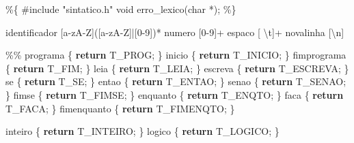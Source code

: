 \documentclass[
  brazilian,
  letterpaper,
]{book}
\newenvironment{Shaded}{\begin{snugshade}}{\end{snugshade}}
\newcommand{\ControlFlowTok}[1]{\textcolor[rgb]{0.00,0.23,0.31}{\textbf{#1}}}
\newcommand{\DataTypeTok}[1]{\textcolor[rgb]{0.68,0.00,0.00}{#1}}
\newcommand{\DecValTok}[1]{\textcolor[rgb]{0.68,0.00,0.00}{#1}}
\newcommand{\ImportTok}[1]{\textcolor[rgb]{0.00,0.46,0.62}{#1}}
\newcommand{\NormalTok}[1]{\textcolor[rgb]{0.00,0.23,0.31}{#1}}
\newcommand{\OperatorTok}[1]{\textcolor[rgb]{0.37,0.37,0.37}{#1}}
\newcommand{\PreprocessorTok}[1]{\textcolor[rgb]{0.68,0.00,0.00}{#1}}
\theoremstyle{plain}
\theoremstyle{definition}
\theoremstyle{remark}
\begin{document}
\begin{Shaded}
\begin{Highlighting}[]
\OperatorTok{\%\{}
\PreprocessorTok{\#include }\ImportTok{"sintatico.h"}
\DataTypeTok{void}\NormalTok{ erro\_lexico}\OperatorTok{(}\DataTypeTok{char} \OperatorTok{*);}
\OperatorTok{\%\}}

\NormalTok{identificador }\OperatorTok{[}\NormalTok{a}\OperatorTok{{-}}\NormalTok{zA}\OperatorTok{{-}}\NormalTok{Z}\OperatorTok{]([}\NormalTok{a}\OperatorTok{{-}}\NormalTok{zA}\OperatorTok{{-}}\NormalTok{Z}\OperatorTok{]|[}\DecValTok{0}\OperatorTok{{-}}\DecValTok{9}\OperatorTok{])*}
\NormalTok{numero }\OperatorTok{[}\DecValTok{0}\OperatorTok{{-}}\DecValTok{9}\OperatorTok{]+}
\NormalTok{espaco }\OperatorTok{[}\NormalTok{ \textbackslash{}t}\OperatorTok{]+}
\NormalTok{novalinha }\OperatorTok{[}\NormalTok{\textbackslash{}n}\OperatorTok{]}

\OperatorTok{\%\%}
\NormalTok{programa          }\OperatorTok{\{} \ControlFlowTok{return}\NormalTok{ T\_PROG}\OperatorTok{;} \OperatorTok{\}}
\NormalTok{inicio            }\OperatorTok{\{} \ControlFlowTok{return}\NormalTok{ T\_INICIO}\OperatorTok{;} \OperatorTok{\}}
\NormalTok{fimprograma       }\OperatorTok{\{} \ControlFlowTok{return}\NormalTok{ T\_FIM}\OperatorTok{;} \OperatorTok{\}}
\NormalTok{leia              }\OperatorTok{\{} \ControlFlowTok{return}\NormalTok{ T\_LEIA}\OperatorTok{;} \OperatorTok{\}}
\NormalTok{escreva           }\OperatorTok{\{} \ControlFlowTok{return}\NormalTok{ T\_ESCREVA}\OperatorTok{;} \OperatorTok{\}}
\NormalTok{se                }\OperatorTok{\{} \ControlFlowTok{return}\NormalTok{ T\_SE}\OperatorTok{;} \OperatorTok{\}}
\NormalTok{entao             }\OperatorTok{\{} \ControlFlowTok{return}\NormalTok{ T\_ENTAO}\OperatorTok{;} \OperatorTok{\}}
\NormalTok{senao             }\OperatorTok{\{} \ControlFlowTok{return}\NormalTok{ T\_SENAO}\OperatorTok{;} \OperatorTok{\}}
\NormalTok{fimse             }\OperatorTok{\{} \ControlFlowTok{return}\NormalTok{ T\_FIMSE}\OperatorTok{;} \OperatorTok{\}}
\NormalTok{enquanto          }\OperatorTok{\{} \ControlFlowTok{return}\NormalTok{ T\_ENQTO}\OperatorTok{;} \OperatorTok{\}}
\NormalTok{faca              }\OperatorTok{\{} \ControlFlowTok{return}\NormalTok{ T\_FACA}\OperatorTok{;} \OperatorTok{\}}
\NormalTok{fimenquanto       }\OperatorTok{\{} \ControlFlowTok{return}\NormalTok{ T\_FIMENQTO}\OperatorTok{;} \OperatorTok{\}}

\NormalTok{inteiro           }\OperatorTok{\{} \ControlFlowTok{return}\NormalTok{ T\_INTEIRO}\OperatorTok{;} \OperatorTok{\}}
\NormalTok{logico            }\OperatorTok{\{} \ControlFlowTok{return}\NormalTok{ T\_LOGICO}\OperatorTok{;} \OperatorTok{\}}


\end{Highlighting}
\end{Shaded}
\end{document}
